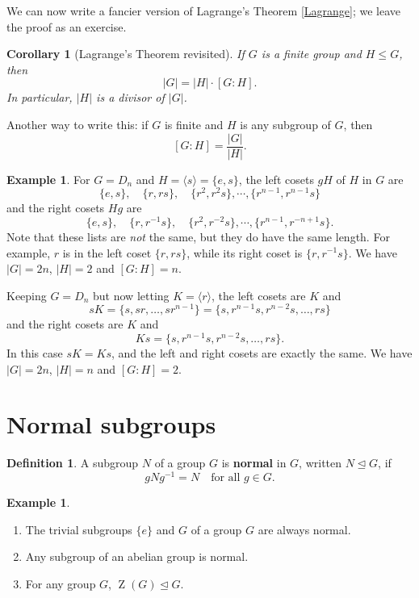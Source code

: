 \documentclass[12pt]{report}
\newtheorem{corollary}[theorem]{Corollary}
\numberwithin{equation}{section}
\numberwithin{theorem}{chapter}
\theoremstyle{definition}
\newtheorem{definition}[theorem]{Definition}
\newtheorem{example}[theorem]{Example}
\newtheorem*{basic properties}{Basic Properties}
\newtheorem*{Important Remark}{Important Remark}
\def\norm{\mathrel{\unlhd}}
\DeclareMathOperator{\Zc}{Z}
\begin{document}
We can now write a fancier version of Lagrange's Theorem \ref{Lagrange}; we leave the proof as an exercise.

\begin{corollary}[Lagrange's Theorem revisited]
If $G$ is a finite group and $H \leq G$, then
$$|G| = |H| \cdot [G : H].$$
In particular, $|H|$ is a divisor of $|G|$.
\end{corollary}

Another way to write this: if $G$ is finite and $H$ is any subgroup of $G$, then 
$$[G:H]=\frac{|G|}{|H|}.$$




\begin{example}\label{example cosets D_n}
For $G =D_{n}$ and $H = \langle s \rangle = \{e,s\}$, the left cosets $gH$ of $H$ in $G$ are 
$$
\{e, s\}, \quad  \{r, rs\}, \quad  \{r^2, r^2s\}, \cdots , \{r^{n-1}, r^{n-1}s\}
$$
and the right cosets $Hg$ are
$$
\{e, s\}, \quad \{r, r^{-1}s\}, \quad \{r^2, r^{-2}s\}, \cdots , \{r^{n-1}, r^{-n+1}s\}.
$$
Note that these lists are {\em not} the same, but they do have the same length. For example, $r$ is in the left coset $\{ r, rs \}$, while its right coset is $\{ r, r^{-1}s \}$. 
We have $|G| = 2n$, $|H| = 2$ and $[G:H] = n$.

Keeping $G = D_{n}$ but now letting $K = \langle r \rangle$, the left cosets are $K$ and 
$$
sK = \{s, sr, \dots, sr^{n-1} \} =\{s, r^{n-1}s, r^{n-2}s,\dots, rs \}
$$
and the right cosets are $K$ and 
$$
Ks = \{s, r^{n-1}s, r^{n-2}s,\dots, rs \}.
$$
In this case $sK = Ks$, and the left and right cosets are exactly the same. We have $|G| = 2n$, $|H| = n$ and $[G:H] = 2$.
\end{example}



\section{Normal subgroups}

\begin{definition}\index{$N \norm G$}
A subgroup $N$ of a group $G$ is {\bf normal} in $G$, written $N\norm G$, if $$gNg^{-1} = N \quad \textrm{for all } g \in G.$$
\end{definition}



\begin{example}$\,$
\begin{enumerate}
\item The trivial subgroups $\{e\}$ and $G$ of a group $G$ are always normal.
\item Any subgroup of an abelian group is normal.
\item For any group $G$, $\Zc(G)\norm G$.
\end{enumerate}
\end{example}
\end{document}
